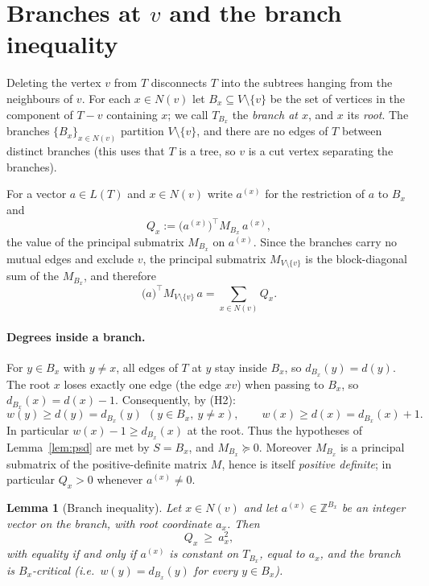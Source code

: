 \documentclass[11pt]{article}
\newcommand{\bZ}{\mathbb{Z}}
\newtheorem{lemma}{Lemma}
\theoremstyle{definition}
\begin{document}
\section{Branches at $v$ and the branch inequality}\label{sec:branch}

Deleting the vertex $v$ from $T$ disconnects $T$ into the subtrees hanging from the
neighbours of $v$. For each $x\in N(v)$ let $B_x\subseteq V\setminus\{v\}$ be the set of
vertices in the component of $T-v$ containing $x$; we call $T_{B_x}$ the
\emph{branch at $x$}, and $x$ its \emph{root}. The branches $\{B_x\}_{x\in N(v)}$
partition $V\setminus\{v\}$, and there are no edges of $T$ between distinct branches
(this uses that $T$ is a tree, so $v$ is a cut vertex separating the branches).

For a vector $a\in L(T)$ and $x\in N(v)$ write $a^{(x)}$ for the restriction of $a$ to
$B_x$ and
\[
Q_x:=\bigl(a^{(x)}\bigr)^\top M_{B_x}\,a^{(x)} ,
\]
the value of the principal submatrix $M_{B_x}$ on $a^{(x)}$. Since the branches carry
no mutual edges and exclude $v$, the principal submatrix $M_{V\setminus\{v\}}$ is the
block-diagonal sum of the $M_{B_x}$, and therefore
\begin{equation}\label{eq:Qsplit}
\bigl(a\bigr)^\top M_{V\setminus\{v\}}\,a=\sum_{x\in N(v)}Q_x .
\end{equation}

\paragraph{Degrees inside a branch.}
For $y\in B_x$ with $y\neq x$, all edges of $T$ at $y$ stay inside $B_x$, so
$d_{B_x}(y)=d(y)$. The root $x$ loses exactly one edge (the edge $xv$) when passing to
$B_x$, so $d_{B_x}(x)=d(x)-1$. Consequently, by (H2):
\begin{equation}\label{eq:branch-deg}
w(y)\ge d(y)=d_{B_x}(y)\ \ (y\in B_x,\ y\neq x),\qquad
w(x)\ge d(x)=d_{B_x}(x)+1 .
\end{equation}
In particular $w(x)-1\ge d_{B_x}(x)$ at the root. Thus the hypotheses of
Lemma~\ref{lem:psd} are met by $S=B_x$, and $M_{B_x}\succeq 0$. Moreover $M_{B_x}$ is a
principal submatrix of the positive-definite matrix $M$, hence is itself
\emph{positive definite}; in particular $Q_x>0$ whenever $a^{(x)}\neq 0$.

\begin{lemma}[Branch inequality]\label{lem:branch}
Let $x\in N(v)$ and let $a^{(x)}\in\bZ^{B_x}$ be an integer vector on the branch, with
root coordinate $a_x$. Then
\begin{equation}\label{eq:branchA}
Q_x\ \ge\ a_x^2 ,
\end{equation}
with equality if and only if $a^{(x)}$ is constant on $T_{B_x}$, equal to $a_x$, and
the branch is $B_x$-critical \textup{(}i.e.\ $w(y)=d_{B_x}(y)$ for every $y\in B_x$\textup{)}.
\end{lemma}
\end{document}
